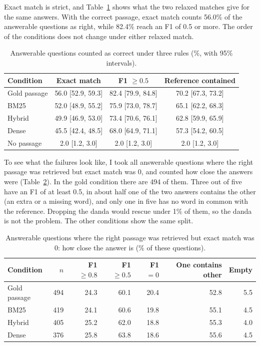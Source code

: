 Exact match is strict, and Table~\ref{tab:relaxed} shows what the two relaxed matches give for the same answers. With the correct passage, exact match counts 56.0\% of the answerable questions as right, while 82.4\% reach an F1 of 0.5 or more. The order of the conditions does not change under either relaxed match.

\begin{table}[H]
	\centering
	\caption{Answerable questions counted as correct under three rules (\%, with 95\% intervals).}
	\label{tab:relaxed}
	\small
	\begin{tabular}{lccc}
		\toprule
		Condition & Exact match & F1 $\ge 0.5$ & Reference contained \\
		\midrule
		Gold passage & 56.0 [52.9, 59.3] & 82.4 [79.9, 84.8] & 70.2 [67.3, 73.2] \\
		BM25 & 52.0 [48.9, 55.2] & 75.9 [73.0, 78.7] & 65.1 [62.2, 68.3] \\
		Hybrid & 49.9 [46.9, 53.0] & 73.4 [70.6, 76.1] & 62.8 [59.9, 65.9] \\
		Dense & 45.5 [42.4, 48.5] & 68.0 [64.9, 71.1] & 57.3 [54.2, 60.5] \\
		No passage & 2.0 [1.2, 3.0] & 2.0 [1.2, 3.0] & 2.0 [1.2, 3.0] \\
		\bottomrule
	\end{tabular}
\end{table}

To see what the failures look like, I took all answerable questions where the right passage was retrieved but exact match was 0, and counted how close the answers were (Table~\ref{tab:close}). In the gold condition there are 494 of them. Three out of five have an F1 of at least 0.5, in about half one of the two answers contains the other (an extra or a missing word), and only one in five has no word in common with the reference. Dropping the danda would rescue under 1\% of them, so the danda is not the problem. The other conditions show the same split.

\begin{table}[H]
	\centering
	\caption{Answerable questions where the right passage was retrieved but exact match was 0: how close the answer is (\% of these questions).}
	\label{tab:close}
	\small
	\begin{tabular}{lrrrrrr}
		\toprule
		Condition & $n$ & F1 $\ge 0.8$ & F1 $\ge 0.5$ & F1 $= 0$ & One contains other & Empty \\
		\midrule
		Gold passage & 494 & 24.3 & 60.1 & 20.4 & 52.8 & 5.5 \\
		BM25 & 419 & 24.1 & 60.6 & 19.8 & 55.1 & 4.5 \\
		Hybrid & 405 & 25.2 & 62.0 & 18.8 & 55.3 & 4.0 \\
		Dense & 376 & 25.8 & 63.8 & 18.6 & 55.6 & 4.5 \\
		\bottomrule
	\end{tabular}
\end{table}

